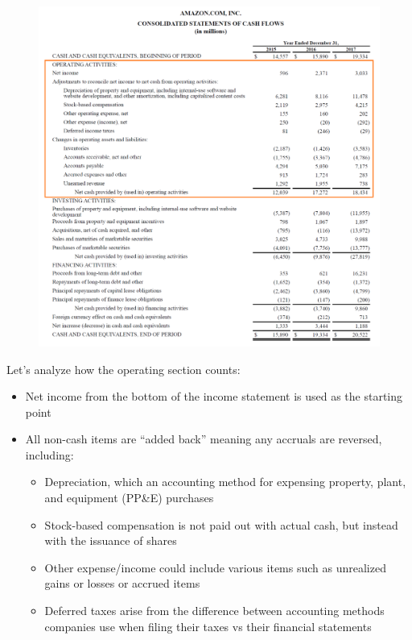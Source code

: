 \documentclass[]{book}
\providecommand{\tightlist}{%
  \setlength{\itemsep}{0pt}\setlength{\parskip}{0pt}}
\begin{document}
\begin{figure}
\centering
\includegraphics{amazon.png}
\caption{}
\end{figure}

Let's analyze how the operating section counts:

\begin{itemize}
\tightlist
\item
  Net income from the bottom of the income statement is used as the
  starting point
\item
  All non-cash items are ``added back'' meaning any accruals are
  reversed, including:

  \begin{itemize}
  \tightlist
  \item
    Depreciation, which an accounting method for expensing property,
    plant, and equipment (PP\&E) purchases
  \item
    Stock-based compensation is not paid out with actual cash, but
    instead with the issuance of shares
  \item
    Other expense/income could include various items such as unrealized
    gains or losses or accrued items
  \item
    Deferred taxes arise from the difference between accounting methods
    companies use when filing their taxes vs their financial statements
  \end{itemize}
\end{itemize}
\end{document}

